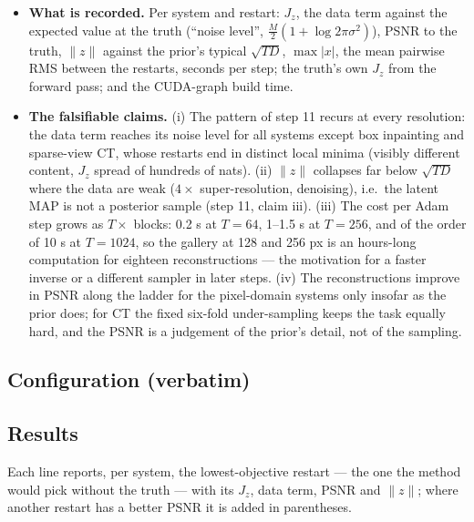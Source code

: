 \documentclass[11pt]{article}
\begin{document}
\begin{itemize}
        compares it with \texttt{radon\_matrix} at 32 px and 8 angles:
        values and gradients agree to $1.4 \times 10^{-14}$ and $4.3 \times
        10^{-14}$ (the weights are kept in float64 and cast per call; a
        float32 copy at construction gave $4 \times 10^{-7}$ and was
        rejected).
  \item \textbf{What is recorded.} Per system and restart: $J_z$, the data
        term against the expected value at the truth (``noise level'',
        $\tfrac{M}{2}(1 + \log 2\pi\sigma^2)$), PSNR to the truth, $\|z\|$
        against the prior's typical $\sqrt{TD}$, $\max|x|$, the mean
        pairwise RMS between the restarts, seconds per step; the truth's
        own $J_z$ from the forward pass; and the CUDA-graph build time.
  \item \textbf{The falsifiable claims.} (i) The pattern of step 11
        recurs at every resolution: the data term reaches its noise level
        for all systems except box inpainting and sparse-view CT, whose
        restarts end in distinct local minima (visibly different content,
        $J_z$ spread of hundreds of nats). (ii) $\|z\|$ collapses far below
        $\sqrt{TD}$ where the data are weak ($4\times$ super-resolution,
        denoising), i.e.\ the latent MAP is not a posterior sample (step
        11, claim iii). (iii) The cost per Adam step grows as $T \times$
        blocks: 0.2 s at $T = 64$, 1--1.5 s at $T = 256$, and of the order
        of 10 s at $T = 1024$, so the gallery at 128 and 256 px is an
        hours-long computation for eighteen reconstructions --- the
        motivation for a faster inverse or a different sampler in later
        steps. (iv) The reconstructions improve in PSNR along the ladder
        for the pixel-domain systems only insofar as the prior does; for CT
        the fixed six-fold under-sampling keeps the task equally hard, and
        the PSNR is a judgement of the prior's detail, not of the sampling.
\end{itemize}

\subsection{Configuration (verbatim)}
{\small}

\subsection{Results}
Each line reports, per system, the lowest-objective restart --- the one the
method would pick without the truth --- with its $J_z$, data term, PSNR and
$\|z\|$; where another restart has a better PSNR it is added in parentheses.
\end{document}
